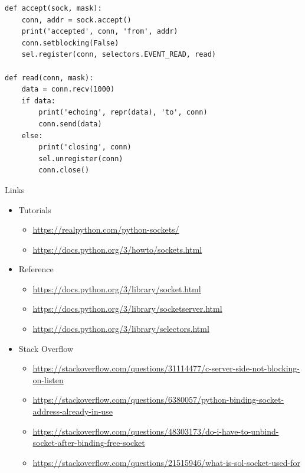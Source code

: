 
\begin{frame}[fragile]
%
\begin{codebox}[... Continued]
\begin{verbatim}
def accept(sock, mask):
    conn, addr = sock.accept()
    print('accepted', conn, 'from', addr)
    conn.setblocking(False)
    sel.register(conn, selectors.EVENT_READ, read)

def read(conn, mask):
    data = conn.recv(1000)
    if data:
        print('echoing', repr(data), 'to', conn)
        conn.send(data)
    else:
        print('closing', conn)
        sel.unregister(conn)
        conn.close()
\end{verbatim}
\end{codebox}
%
\end{frame}


\begin{frame}{Links}
%
\begin{itemize}
\item Tutorials
	\begin{itemize}
	\scriptsize
	\item \url{https://realpython.com/python-sockets/}
	\item \url{https://docs.python.org/3/howto/sockets.html}
	\end{itemize}
\item Reference
	\begin{itemize}
	\scriptsize
	\item \url{https://docs.python.org/3/library/socket.html}
	\item \url{https://docs.python.org/3/library/socketserver.html}
	\item \url{https://docs.python.org/3/library/selectors.html}
	\end{itemize}
\item Stack Overflow
	\begin{itemize}
	\scriptsize
	\item \url{https://stackoverflow.com/questions/31114477/c-server-side-not-blocking-on-listen}
	\item \url{https://stackoverflow.com/questions/6380057/python-binding-socket-address-already-in-use}
	\item \url{https://stackoverflow.com/questions/48303173/do-i-have-to-unbind-socket-after-binding-free-socket}
	\item \url{https://stackoverflow.com/questions/21515946/what-is-sol-socket-used-for}
	\end{itemize}
\end{itemize}
%
\end{frame}

